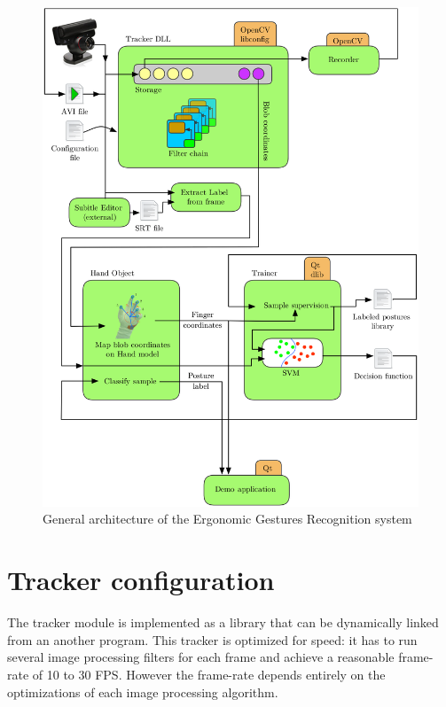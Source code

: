\begin{figure}[H]
\center
\includegraphics[width=1\textwidth]{images/arch} 
\caption{General architecture of the Ergonomic Gestures Recognition system}
\label{fig:architecture}
\end{figure}

\section{Tracker configuration}
\label{sec:tracker-configuration}

The tracker module is implemented as a library that can be dynamically linked from an another program. This tracker is optimized for speed: it has to run several image processing filters for each frame and achieve a reasonable frame-rate of 10 to 30 FPS. However the frame-rate depends entirely on the optimizations of each image processing algorithm.

